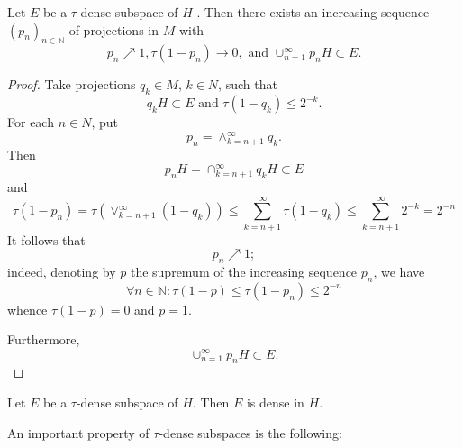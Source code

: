 \begin{proposition}
    Let $E$ be a $\tau$-dense subspace of $H$ . Then there exists an increasing sequence $(p_n)_{n\in \mathbb{N}}$ of projections in $M$ with
\[
    p_n\nearrow 1,\tau(1-p_n)\to 0,\text{ and } \cup_{n=1}^\infty p_nH\subset E.
\]
\end{proposition}
\begin{proof}
    Take projections $q_k\in M$, $k\in N$, such that 
    \[
        q_kH\subset E \text{ and } \tau(1-q_k)\leq 2^{-k}.
    \]   
    For each $n\in N$, put
    \[
        p_n=\wedge_{k=n+1}^\infty q_k.    
    \]
    Then
    \[
        p_nH=\cap_{k=n+1}^\infty q_kH\subset E  
    \]
    and 
    \[
        \tau(1-p_n)=\tau\left( \vee_{k=n+1}^\infty(1-q_k) \right)\leq \sum_{k=n+1}^\infty\tau(1-q_k)\leq \sum_{k=n+1}^\infty 2^{-k}=2^{-n}  
    \]
    It follows that
    \[
        p_n\nearrow 1;  
    \]
    indeed, denoting by $p$ the supremum of the increasing sequence $p_n$, we have
    \[
        \forall n\in \mathbb{N}:\tau(1-p)\leq \tau(1-p_n)\leq 2^{-n} 
    \]
    whence $\tau(1-p)=0$ and $p=1$.\par
    Furthermore,
    \[
        \cup_{n=1}^\infty p_nH\subset E.  
    \]
\end{proof}
\begin{corollary}
    Let $E$ be a $\tau$-dense subspace of $H$. Then $E$ is dense in $H$.
\end{corollary}
An important property of $\tau$-dense subspaces is the following:
% 